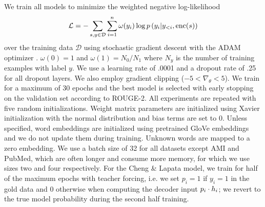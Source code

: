 


We train all models to minimize the weighted negative log-likelihood
\[\mathcal{L} = -\sum_{s,y\in \mathcal{D}} \sum_{i=1}^\docSize \omega(y_i) \log p\left(y_i|y_{<i},
\operatorname{enc}(\sent)\right)\]
over the training data $\mathcal{D}$
using stochastic gradient descent with the ADAM optimizer
\cite{kingma2014adam}.
$\omega(0)=1$ and $\omega(1) = N_0/N_1$ where $N_y$ is the number of 
training examples with label $y$.
    We use a learning rate of .0001 and a dropout rate of .25 for all dropout
    layers. We also employ gradient clipping ($-5 < \nabla_\theta < 5$).
    We train for a maximum of 30 epochs and the best
    model is selected with early stopping on the validation set according
    to ROUGE-2. All experiments are repeated with five random
    initializations. Weight matrix parameters are initialized using 
    Xavier initialization with the normal distribution 
    \cite{glorot2010understanding} and bias terms are set to 0.
    Unless specified, word embeddings are initialized 
    using pretrained GloVe embeddings \cite{pennington2014glove} and we do 
    not update them during training. Unknown words are mapped to a zero 
    embedding.
    We use a batch size of 32 for all datasets except AMI and PubMed, which
    are often longer and consume more memory, for
    which we use sizes two and four respectively.
    For the Cheng \& Lapata model, we train for half of the maximum epochs 
    with teacher forcing, i.e. we set $p_i = 1$
    if $y_i = 1$ in the gold data and 0 otherwise 
    when computing the decoder input 
    $p_i \cdot \sentEmb[i]$; we revert to the true model probability 
    during the second half training.



